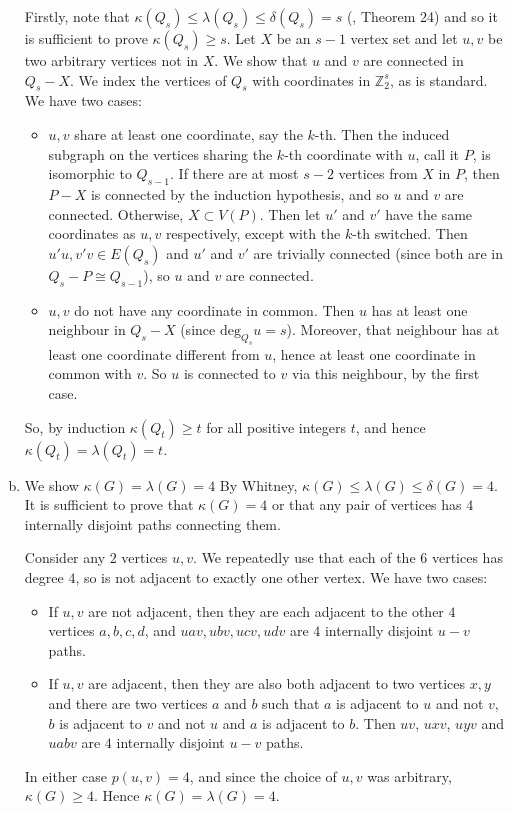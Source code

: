 \begin{enumerate}[(a)]
	Firstly, note that $\kappa(Q_s)\le\lambda(Q_s)\le \delta(Q_s)=s$ (\cite{notes}, Theorem 24)
	and so it is sufficient to prove $\kappa(Q_s)\ge s$. Let $X$ be an $s-1$ vertex
	set and let $u,v$ be two arbitrary vertices not in $X$. We show that $u$ and $v$
	are connected in $Q_s-X$. We index the vertices of $Q_s$ with coordinates in
	$\mathbb{Z}_2^s$, as is standard. We have two cases:
	\begin{itemize}
		\item $u,v$ share at least one coordinate, say the $k$-th. Then the induced
			subgraph on the vertices sharing the $k$-th coordinate with $u$, call it $P$, 
			is isomorphic to $Q_{s-1}$.
			If there are at most $s-2$ vertices from $X$ in $P$, then $P-X$ is connected
			by the induction hypothesis, and so $u$ and $v$ are connected.
			Otherwise, $X \subset V(P)$. Then let $u'$ and $v'$ have the same coordinates
			as $u,v$ respectively, except with the $k$-th switched. Then 
			$u'u,v'v \in E(Q_s)$ and $u'$ and $v'$ are trivially connected (since both are
			in $Q_s-P \cong Q_{s-1}$), so $u$ and $v$ are connected.
		\item $u,v$ do not have any coordinate in common. Then $u$ has at least one neighbour
			in $Q_s-X$ (since $\text{deg}_{Q_s} u = s$). Moreover, that neighbour has at
			least one coordinate different from $u$, hence at least one coordinate in common
			with $v$. So $u$ is connected to $v$ via this neighbour, by the first case.
	\end{itemize}
	So, by induction $\kappa(Q_t) \ge t$ for all positive integers $t$, and hence
	$\kappa(Q_t)=\lambda(Q_t)=t$.

\item We show $\kappa(G)=\lambda(G)=4$
	By Whitney, $\kappa(G) \le \lambda(G) \le \delta(G)=4$. It is sufficient to
	prove that $\kappa(G)=4$ or that any pair of vertices has $4$ internally
	disjoint paths connecting them.

	Consider any $2$ vertices $u,v$. We repeatedly use that each of the $6$
	vertices has degree $4$, so is not adjacent to exactly one other vertex.
	We have two cases:
	\begin{itemize}
		\item If $u,v$ are not adjacent, then they are each adjacent to the other
			$4$ vertices $a,b,c,d$, and $uav,ubv,ucv,udv$ are $4$ internally disjoint
			$u-v$ paths.

		\item If $u,v$ are adjacent, then they are also both adjacent to two
			vertices $x,y$ and there are two vertices $a$ and $b$ such that $a$ is
			adjacent to $u$ and not $v$, $b$ is adjacent to $v$ and not $u$ and
			$a$ is adjacent to $b$. Then $uv$, $uxv$, $uyv$ and $uabv$ are $4$
			internally disjoint $u-v$ paths.
	\end{itemize}
	In either case $p(u,v)=4$, and since the choice of $u,v$ was arbitrary,
	$\kappa(G) \ge 4$. Hence $\kappa(G)=\lambda(G)=4$.
\end{enumerate}
